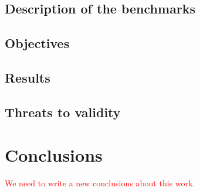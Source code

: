 \documentclass[twocolumn]{autart}    %
\begin{document}
\subsection{Description of the benchmarks}
\label{exp:benchmarks}


\subsection{Objectives}
\label{exp:objectives}


\subsection{Results}
\label{exp:results}

\subsection{Threats to validity}
\label{exp:threats-to-validity}

\section{Conclusions}
\label{sec:conclusions}

\textcolor{red}{We need to write a new conclusions about this work.}




\end{document}
